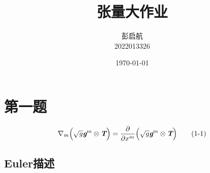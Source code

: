 \documentclass[UTF8]{ctexart}
\title{张量大作业}
\author{彭启航\\2022013326}
\date{\today}
\begin{document}
\maketitle

\section{第一题}

\begin{equation*}
 \nabla_m\Big(\sqrt{g}\textit{\textbf{g}}^m\otimes \textit{\textbf{T}} 
\Big)=\frac{\partial}{\partial x^m}\Big(\sqrt{g}\textit{\textbf{g}}^m\otimes \textit{\textbf{T}} \Big)\tag{1-1}
\end{equation*}

\subsection{Euler描述}
\end{document}
